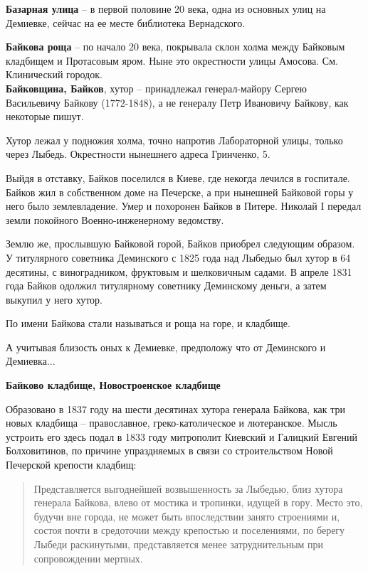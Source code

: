 \medskip

\textbf{Базарная улица} – в первой половине 20 века, одна из основных улиц на Демиевке, сейчас на ее месте библиотека Вернадского.\\

\medskip


\textbf{Байкова роща} – по начало 20 века, покрывала склон холма между Байковым кладбищем и Протасовым яром. Ныне это окрестности улицы Амосова. См. Клинический городок.\\

\textbf{Байковщина, Байков}, хутор – принадлежал генерал-майору Сергею Васильевичу Байкову (1772-1848), а не генералу Петр Ивановичу Байкову, как некоторые пишут.

Хутор лежал у подножия холма, точно напротив Лабораторной улицы, только через Лыбедь. Окрестности нынешнего адреса Гринченко, 5.

Выйдя в отставку, Байков поселился в Киеве, где некогда лечился в госпитале. Байков жил в собственном доме на Печерске, а при нынешней Байковой горы у него было землевладение. Умер и похоронен Байков в Питере. Николай I передал земли покойного Военно-инженерному ведомству.

Землю же, прослывшую Байковой горой, Байков приобрел следующим образом. У титулярного советника Деминского с 1825 года над Лыбедью был хутор в 64 десятины, с виноградником, фруктовым и шелковичным садами. В апреле 1831 года Байков одолжил титулярному советнику Деминскому деньги, а затем выкупил у него хутор.

По имени Байкова стали называться и роща на горе, и кладбище.

А учитывая близость оных к Демиевке, предположу что от Деминского и Демиевка...\\


\medskip

\textbf{Байково кладбище, Новостроенское кладбище}

Образовано в 1837 году на шести десятинах хутора генерала Байкова, как три новых кладбища – православное, греко-католическое и лютеранское. Мысль устроить его здесь подал в 1833 году митрополит Киевский и Галицкий Евгений Болховитинов, по причине упраздняемых в связи со строительством Новой Печерской крепости кладбищ:

\begin{quotation}
Представляется выгоднейшей возвышенность за Лыбедью, близ хутора генерала Байкова, влево от мостика и тропинки, идущей в гору. Место это, будучи вне города, не может быть впоследствии занято строениями и, состоя почти в средоточии между крепостью и поселениями, по берегу Лыбеди раскинутыми, представляется менее затруднительным при сопровождении мертвых.
\end{quotation}


